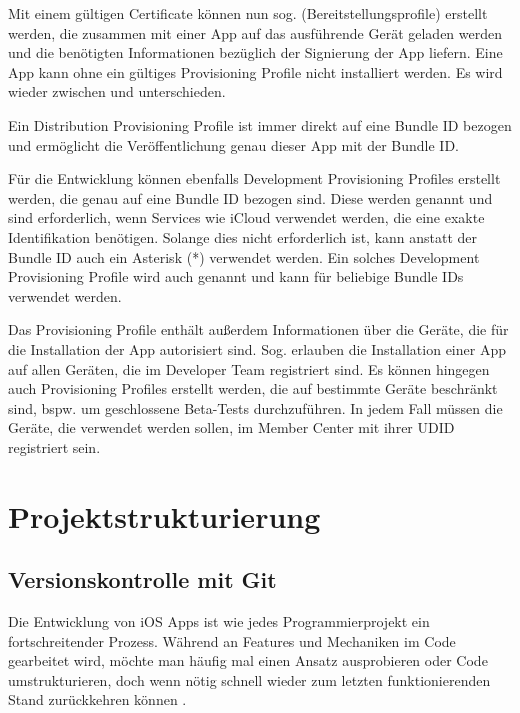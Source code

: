 \documentclass[parskip=half, final]{scrreprt}
\begin{document}
Mit einem gültigen Certificate können nun sog.  (Bereitstellungsprofile) erstellt werden, die zusammen mit einer App auf das ausführende Gerät geladen werden und die benötigten Informationen bezüglich der Signierung der App liefern. Eine App kann ohne ein gültiges Provisioning Profile nicht installiert werden. Es wird wieder zwischen  und  unterschieden.

Ein Distribution Provisioning Profile ist immer direkt auf eine Bundle ID bezogen und ermöglicht die Veröffentlichung genau dieser App mit der Bundle ID.

Für die Entwicklung können ebenfalls Development Provisioning Profiles erstellt werden, die genau auf eine Bundle ID bezogen sind. Diese werden  genannt und sind erforderlich, wenn Services wie iCloud verwendet werden, die eine exakte Identifikation benötigen. Solange dies nicht erforderlich ist, kann anstatt der Bundle ID auch ein Asterisk (*) verwendet werden. Ein solches Development Provisioning Profile wird auch  genannt und kann für beliebige Bundle IDs verwendet werden.

Das Provisioning Profile enthält außerdem Informationen über die Geräte, die für die Installation der App autorisiert sind. Sog.  erlauben die Installation einer App auf allen Geräten, die im Developer Team registriert sind. Es können hingegen auch Provisioning Profiles erstellt werden, die auf bestimmte Geräte beschränkt sind, bspw. um geschlossene Beta-Tests durchzuführen. In jedem Fall müssen die Geräte, die verwendet werden sollen, im Member Center mit ihrer UDID registriert sein.



\chapter{Projektstrukturierung}


\section{Versionskontrolle mit Git} \label{sec:git}

Die Entwicklung von iOS Apps ist wie jedes Programmierprojekt ein fortschreitender Prozess. Während an Features und Mechaniken im Code gearbeitet wird, möchte man häufig mal einen Ansatz ausprobieren oder Code umstrukturieren, doch wenn nötig schnell wieder zum letzten funktionierenden Stand zurückkehren können .
\end{document}
